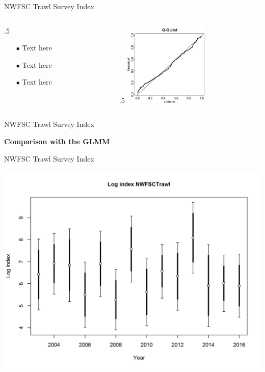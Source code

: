 \documentclass[ignorenonframetext,]{beamer}
\def\begincols{\begin{columns}}
\def\begincol{\begin{column}}
\def\endcol{\end{column}}
\def\endcols{\end{columns}}
\begin{document}
\begin{frame}{NWFSC Trawl Survey Index}

\begincols
 \begincol{.5\textwidth}

\begin{itemize}
\item[$\bullet$] Text here
\item[$\bullet$] Text here
\item[$\bullet$] Text here
\end{itemize}

\endcol
 \begincol{.5\textwidth}
\includegraphics[height=4cm]{Figures/NWFSCtrawl_QQ.jpg}

\endcol
\endcols

\end{frame}

\begin{frame}{NWFSC Trawl Survey Index}

\textbf{Comparison with the GLMM}

\end{frame}

\begin{frame}{NWFSC Trawl Survey Index}

\centering
\includegraphics{r4ss/plots_mod1/index4_logcpuedata_NWFSCtrawl.png}

\end{frame}
\end{document}
